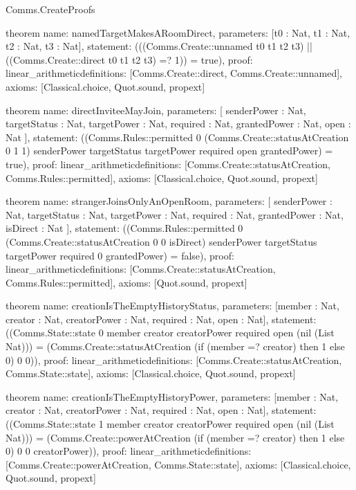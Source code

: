 \begin{lexlean}{Comms.CreateProofs}
\begin{semanticmodule}
theorem{
  name: namedTargetMakesARoomDirect,
  parameters: [t0 : Nat, t1 : Nat, t2 : Nat, t3 : Nat],
  statement: (((Comms.Create::unnamed t0 t1 t2 t3) || ((Comms.Create::direct t0 t1 t2 t3) =? 1)) = true),
  proof: linear_arithmetic{definitions: [Comms.Create::direct, Comms.Create::unnamed]},
  axioms: [Classical.choice, Quot.sound, propext]
}

theorem{
  name: directInviteeMayJoin,
  parameters: [
    senderPower : Nat,
    targetStatus : Nat,
    targetPower : Nat,
    required : Nat,
    grantedPower : Nat,
    open : Nat
  ],
  statement: ((Comms.Rules::permitted 0 (Comms.Create::statusAtCreation 0 1 1) senderPower targetStatus targetPower required open grantedPower) = true),
  proof: linear_arithmetic{definitions: [Comms.Create::statusAtCreation, Comms.Rules::permitted]},
  axioms: [Classical.choice, Quot.sound, propext]
}

theorem{
  name: strangerJoinsOnlyAnOpenRoom,
  parameters: [
    senderPower : Nat,
    targetStatus : Nat,
    targetPower : Nat,
    required : Nat,
    grantedPower : Nat,
    isDirect : Nat
  ],
  statement: ((Comms.Rules::permitted 0 (Comms.Create::statusAtCreation 0 0 isDirect) senderPower targetStatus targetPower required 0 grantedPower) = false),
  proof: linear_arithmetic{definitions: [Comms.Create::statusAtCreation, Comms.Rules::permitted]},
  axioms: [Quot.sound, propext]
}

theorem{
  name: creationIsTheEmptyHistoryStatus,
  parameters: [member : Nat, creator : Nat, creatorPower : Nat, required : Nat, open : Nat],
  statement: ((Comms.State::state 0 member creator creatorPower required open (nil (List Nat))) = (Comms.Create::statusAtCreation (if (member =? creator) then 1 else 0) 0 0)),
  proof: linear_arithmetic{definitions: [Comms.Create::statusAtCreation, Comms.State::state]},
  axioms: [Classical.choice, Quot.sound, propext]
}

theorem{
  name: creationIsTheEmptyHistoryPower,
  parameters: [member : Nat, creator : Nat, creatorPower : Nat, required : Nat, open : Nat],
  statement: ((Comms.State::state 1 member creator creatorPower required open (nil (List Nat))) = (Comms.Create::powerAtCreation (if (member =? creator) then 1 else 0) 0 0 creatorPower)),
  proof: linear_arithmetic{definitions: [Comms.Create::powerAtCreation, Comms.State::state]},
  axioms: [Classical.choice, Quot.sound, propext]
}
\end{semanticmodule}
\end{lexlean}
